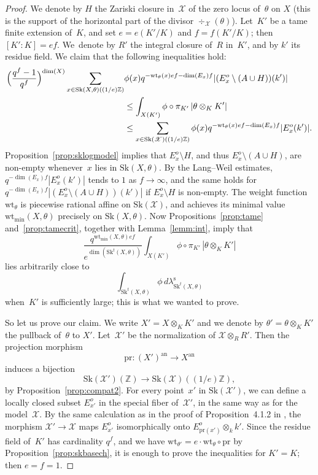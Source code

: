 \documentclass[JEP,XML,SOM,Unicode,NoFloatCountersInSection]{cedram}
\theoremstyle{definition}
\numberwithin{equation}{subsection}
\newcommand{\Z}{\ensuremath{\mathbb{Z}}}
\newcommand{\cX}{\ensuremath{\mathscr{X}}}
\newcommand{\an}{\mathrm{an}}
\newcommand{\pr}{\mathrm{pr}}
\newcommand{\Sk}{\mathrm{Sk}}
\newcommand{\rs}{\mathrm{s}}
\newcommand{\wt}{\mathrm{wt}}
\let\form\theta
\let\Leb\lambda
\begin{document}
\begin{proof}
We denote by $H$ the Zariski closure in~$\cX$ of the zero locus of~$\form$ on $X$ (this is the support of the horizontal part of the divisor $\div_{\cX}(\form)$).
Let~$K'$ be a tame finite extension of~$K$, and set $e=e(K'/K)$ and $f=f(K'/K)$; then $[K'\colon K]=ef$. We~denote by $R'$ the integral closure of~$R$ in~$K'$, and by $k'$ its residue field.
We claim that the following inequalities hold:
\begin{align*}
\Bigl(\frac{q^f-1}{q^f}\Bigr)^{\dim(X)} \sum_{x\in \Sk(X,\form)((1/e)\Z)}&\phi(x)q^{-\wt_{\form}(x)ef-\dim(E_x)f}|(E_x^o\setminus (A\cup H))(k')|
\\ & \leq \int_{X(K')}\phi\circ\pi_{K'}\,|\form\otimes_K K'|
\\
& \leq \sum_{x\in \Sk(\cX)((1/e)\Z)} \phi(x)q^{-\wt_{\form}(x)ef-\dim(E_x)f}|E_x^o(k')|.
\end{align*}
Proposition~\ref{prop:sklogmodel} implies that
$E^o_x\setminus H$, and thus $E^o_x\setminus (A\cup H)$, are non-empty whenever~$x$ lies in $\Sk(X,\form)$.
By the Lang--Weil estimates, $q^{-\dim(E_x)f}|E_x^o(k')|$ tends to $1$ as $f\to \infty$, and the same holds for $q^{-\dim(E_x)f}|(E_x^o\setminus (A\cup H))(k')|$ if $E_x^o\setminus H$ is non-empty. The weight function $\wt_{\form}$ is piecewise rational affine on $\Sk(\cX)$, and achieves its minimal value $\wt_{\min}(X,\form)$ precisely on $\Sk(X,\form)$.
Now Propositions~\ref{prop:tame} and~\ref{prop:tamecrit}, together with Lemma~\ref{lemm:int}, imply that
\[
\frac{q^{\wt_{\min}(X,\form)ef}}{e^{\dim(\Sk^t(X,\form))}}\int_{X(K')}\phi\circ\pi_{K'}\,|\form\otimes_K K'|
\]
lies arbitrarily close to
\[
\int_{\Sk^t(X,\form)}\phi\,d\Leb^{\rs}_{\Sk^t(X,\form)}
\]
when~$K'$ is sufficiently large; this is what we wanted to prove.

So let us prove our claim. We write $X'=X\otimes_K K'$ and we denote by $\form'=\form \otimes_K K'$ the pullback of~$\form$ to $X'$.
Let~$\cX'$ be the normalization of $\cX\otimes_R R'$. Then the projection morphism
\[
\pr\colon (X')^{\an}\to X^{\an}
\]
induces a bijection
\[
\Sk(\cX')(\Z)\to \Sk(\cX)((1/e)\Z),
\]
by Proposition~\ref{prop:compat2}. For every point~$x'$ in $\Sk(\cX')$, we can define a locally closed subset $E_{x'}^o$ in the special fiber of~$\cX'$, in the same way as for the model~$\cX$.
By the same calculation as in the proof of Proposition~4.1.2 in \cite{logzeta}, the morphism $\cX'\to \cX$
maps $E^o_{x'}$ isomorphically onto $E_{\pr(x')}^o\otimes_k k'$. Since the residue field of~$K'$ has cardinality $q^f$, and
we have $\wt_{\form'}=e\cdot \wt_{\form}\circ \pr$ by Proposition~\ref{prop:skbasech}, it is enough to prove the inequalities for $K'=K$; then $e=f=1$.


\end{proof}
\end{document}
